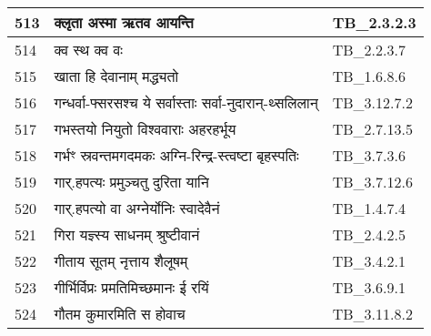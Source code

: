 \documentclass[17pt]{extarticle}
\begin{document}
\begin{longtable}{||p{0.4in}||p{4.9in}||p{0.9in}||}
    \hline
        
    513 & क्लृता अस्मा ऋतव आयन्ति & TB\_2.3.2.3       \\
    
    \hline
        
    514 & क्व स्थ क्व वः & TB\_2.2.3.7       \\
    
    \hline
        
    515 & खाता हि देवानाम् मद्ध्यतो & TB\_1.6.8.6       \\
    
    \hline
        
    516 & गन्धर्वा{-}फ्सरसश्च ये सर्वास्ताः सर्वा{-}नुदारान्{-}थ्सलिलान् & TB\_3.12.7.2       \\
    
    \hline
        
    517 & गभस्तयो नियुतो विश्ववाराः अहरहर्भूय & TB\_2.7.13.5       \\
    
    \hline
        
    518 & गर्भꣳ स्रवन्तमगदमकः अग्नि{-}रिन्द्र{-}स्त्वष्टा बृहस्पतिः & TB\_3.7.3.6       \\
    
    \hline
        
    519 & गार्.हपत्यः प्रमुञ्चतु दुरिता यानि & TB\_3.7.12.6       \\
    
    \hline
        
    520 & गार्.हपत्यो वा अग्नेर्योनिः स्वादेवैनं & TB\_1.4.7.4       \\
    
    \hline
        
    521 & गिरा यज्ञ्स्य साधनम् श्रुष्टीवानं & TB\_2.4.2.5       \\
    
    \hline
        
    522 & गीताय सूतम् नृत्ताय शैलूषम् & TB\_3.4.2.1       \\
    
    \hline
        
    523 & गीर्भिर्विप्रः प्रमतिमिच्छमानः ई रयिं & TB\_3.6.9.1       \\
    
    \hline
        
    524 & गौतम कुमारमिति स होवाच & TB\_3.11.8.2       \\
    
    \hline
        

\end{longtable}
\end{document}
